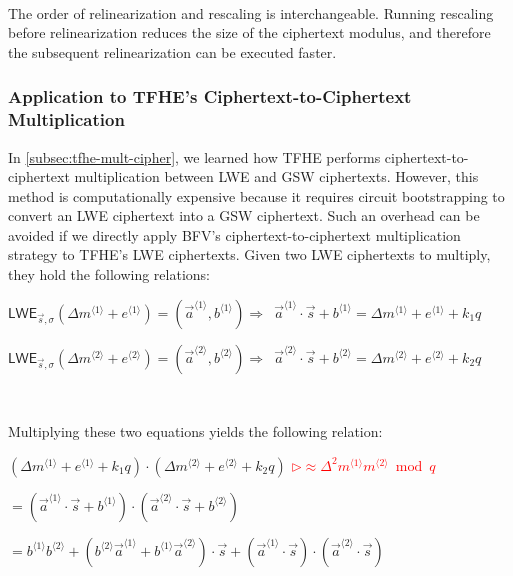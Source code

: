 $ $

 The order of relinearization and rescaling is interchangeable. Running rescaling before relinearization reduces the size of the ciphertext modulus, and therefore the subsequent relinearization can be executed faster. 



\subsubsection{Application to TFHE's Ciphertext-to-Ciphertext Multiplication}
\label{subsubsec:bfv-mult-cipher-tfhe}


In \autoref{subsec:tfhe-mult-cipher}, we learned how TFHE performs ciphertext-to-ciphertext multiplication between LWE and GSW ciphertexts. However, this method is computationally expensive because it requires circuit bootstrapping to convert an LWE ciphertext into a GSW ciphertext. Such an overhead can be avoided if we directly apply BFV's ciphertext-to-ciphertext multiplication strategy to TFHE's LWE ciphertexts. Given two LWE ciphertexts to multiply, they hold the following relations:

$\textsf{LWE}_{\vec{s}, \sigma}(\Delta m^{\langle 1 \rangle} + e^{\langle 1 \rangle}) = (\vec{a}^{\langle 1 \rangle}, b^{\langle 1 \rangle }) \Rightarrow \,\,\, \vec{a}^{\langle 1 \rangle} \cdot \vec{s} + b^{\langle 1 \rangle} = \Delta m^{\langle 1 \rangle} + e^{\langle 1 \rangle} + k_1q$

$\textsf{LWE}_{\vec{s}, \sigma}(\Delta m^{\langle 2 \rangle} + e^{\langle 2 \rangle})  = (\vec{a}^{\langle 2 \rangle}, b^{\langle 2 \rangle}) \Rightarrow \,\,\, \vec{a}^{\langle 2 \rangle} \cdot \vec{s} + b^{\langle 2 \rangle} = \Delta m^{\langle 2 \rangle} + e^{\langle 2 \rangle} + k_2q$

$ $

Multiplying these two equations yields the following relation: 


$(\Delta m^{\langle 1 \rangle} + e^{\langle 1 \rangle} + k_1q) \cdot (\Delta m^{\langle 2 \rangle} + e^{\langle 2 \rangle} + k_2q)$ \textcolor{red}{ $\rhd \approx \Delta^2 m^{\langle 1 \rangle} m^{\langle 2 \rangle} \bmod q$ }

$ = (\vec{a}^{\langle 1 \rangle} \cdot \vec{s} + b^{\langle 1 \rangle}) \cdot (\vec{a}^{\langle 2 \rangle} \cdot \vec{s} + b^{\langle 2 \rangle})$ 

$ = b^{\langle 1 \rangle}b^{\langle 2 \rangle}  + (b^{\langle 2 \rangle}\vec{a}^{\langle 1 \rangle} + b^{\langle 1 \rangle}\vec{a}^{\langle 2 \rangle}) \cdot \vec{s} + (\vec{a}^{\langle 1 \rangle} \cdot \vec{s}) \cdot (\vec{a}^{\langle 2 \rangle} \cdot \vec{s}) $



